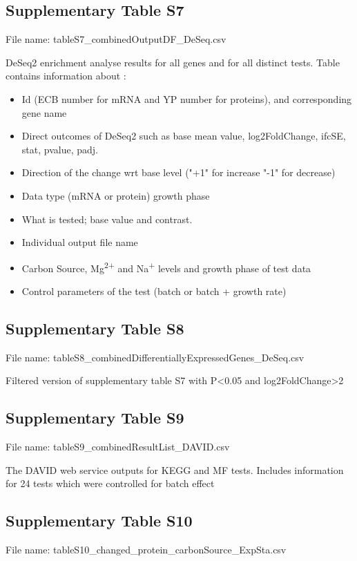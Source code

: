 \documentclass[a4paper]{article}
\begin{document}
\subsection*{Supplementary Table S7}
File name: tableS7\_combinedOutputDF\_DeSeq.csv

DeSeq2 enrichment analyse results for all genes and for all distinct tests. 
Table contains information about :
\begin{itemize}
\item Id (ECB number for mRNA and YP number for proteins), and corresponding gene name
\item Direct outcomes of DeSeq2 such as base mean value, log2FoldChange, ifcSE, stat, pvalue, padj.
\item Direction of the change wrt base level ("+1" for increase "-1" for decrease)
\item Data type (mRNA or protein)
growth phase
\item What is tested; base value and contrast.
\item Individual output file name 
\item Carbon Source, Mg\textsuperscript{2+} and Na\textsuperscript{+} levels and growth phase of test data 
\item Control parameters of the test (batch or batch + growth rate)
\end{itemize}

\subsection*{Supplementary Table S8}
File name: tableS8\_combinedDifferentiallyExpressedGenes\_DeSeq.csv

Filtered version of supplementary table S7 with P<0.05 and log2FoldChange>2

\subsection*{Supplementary Table S9}
File name: tableS9\_combinedResultList\_DAVID.csv

The DAVID web service outputs for KEGG and MF tests. Includes information for 24 tests which were controlled for batch effect

\subsection*{Supplementary Table S10}
File name: tableS10\_changed\_protein\_carbonSource\_ExpSta.csv
\end{document}
